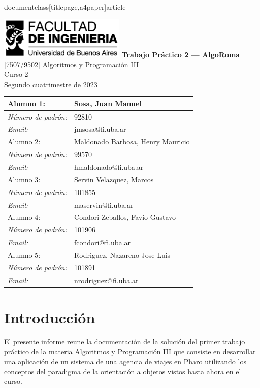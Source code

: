 \\documentclass[titlepage,a4paper]{article}
\begin{document}
\begin{titlepage} %
	\hfill\includegraphics[width=6cm]{logofiuba.jpg}
    \centering
    \vfill
    \Huge \textbf{Trabajo Práctico 2 — AlgoRoma}
    \vskip2cm
    \Large [7507/9502] Algoritmos y Programación III\\
    Curso 2 \\ %
    Segundo cuatrimestre de 2023 
    \vfill
    \begin{tabular}{ | l | l | } %
      \hline
      Alumno 1: & Sosa, Juan Manuel \\ \hline
      \textit{Número de padrón:} & 92810 \\ \hline
      \textit{ Email:} & jmsosa@fi.uba.ar \\ \hline
      Alumno 2: & Maldonado Barbosa, Henry Mauricio \\ \hline
      \textit{Número de padrón:} & 99570 \\ \hline
      \textit{Email:} & hmaldonado@fi.uba.ar \\ \hline
      Alumno 3: & Servin Velazquez, Marcos \\ \hline
      \textit{Número de padrón:} & 101855 \\ \hline
      \textit{Email:} & maservin@fi.uba.ar \\ \hline
      Alumno 4: & Condori Zeballos, Favio Gustavo \\ \hline
      \textit{Número de padrón:} & 101906 \\ \hline
      \textit{Email:} & fcondori@fi.uba.ar \\ \hline
      Alumno 5: & Rodriguez, Nazareno Jose Luis \\ \hline
      \textit{Número de padrón:} & 101891 \\ \hline
      \textit{Email: }& nrodriguez@fi.uba.ar \\ \hline
  	\end{tabular}
    \vfill
    \vfill
\end{titlepage}




\tableofcontents %
\newpage

\section{Introducción}\label{sec:intro}
El presente informe reune la documentación de la solución del primer trabajo práctico de la materia Algoritmos y Programación III que consiste en desarrollar una aplicación de un sistema de una agencia de viajes en Pharo utilizando los conceptos del paradigma de la orientación a objetos vistos hasta ahora en el curso.
\end{document}
